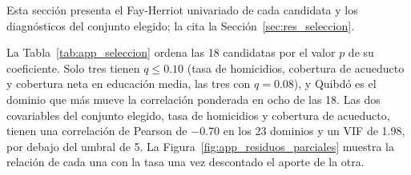 Esta sección presenta el Fay-Herriot univariado de cada candidata y los diagnósticos del conjunto elegido; la cita la Sección~\ref{sec:res_seleccion}.

La Tabla~\ref{tab:app_seleccion} ordena las 18 candidatas por el valor $p$ de su coeficiente. Solo tres tienen $q \le 0.10$ (tasa de homicidios, cobertura de acueducto y cobertura neta en educación media, las tres con $q = 0.08$), y Quibdó es el dominio que más mueve la correlación ponderada en ocho de las 18. Las dos covariables del conjunto elegido, tasa de homicidios y cobertura de acueducto, tienen una correlación de Pearson de $-0.70$ en los 23 dominios y un VIF de 1.98, por debajo del umbral de 5. La Figura~\ref{fig:app_residuos_parciales} muestra la relación de cada una con la tasa una vez descontado el aporte de la otra.

